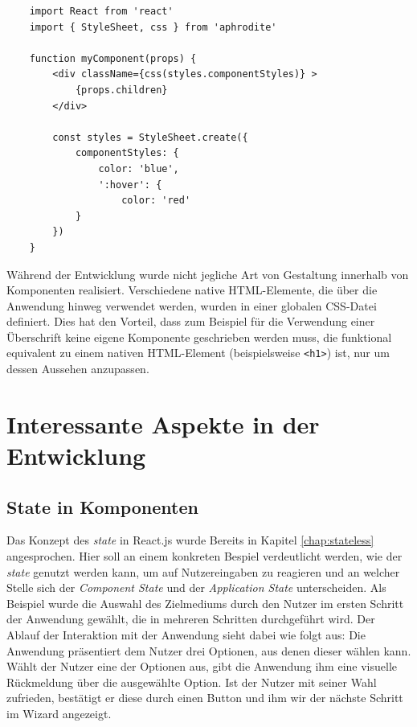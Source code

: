 
\begin{lstlisting}
	import React from 'react'
	import { StyleSheet, css } from 'aphrodite'

	function myComponent(props) {
		<div className={css(styles.componentStyles)} >
			{props.children}
		</div>

		const styles = StyleSheet.create({
			componentStyles: {
				color: 'blue',
				':hover': {
					color: 'red'
			}
		})
	}
\end{lstlisting}

Während der Entwicklung wurde nicht jegliche Art von Gestaltung innerhalb von Komponenten realisiert. Verschiedene native HTML-Elemente, die über die Anwendung hinweg verwendet werden, wurden in einer globalen CSS-Datei definiert. Dies hat den Vorteil, dass zum Beispiel für die Verwendung einer Überschrift keine eigene Komponente geschrieben werden muss, die funktional equivalent zu einem nativen HTML-Element (beispielsweise \verb|<h1>|) ist, nur um dessen Aussehen anzupassen.

\section{Interessante Aspekte in der Entwicklung}

\subsection{State in Komponenten}
\label{chap:state_component}
Das Konzept des \textit{state} in React.js wurde Bereits in Kapitel \ref{chap:stateless} angesprochen. Hier soll an einem konkreten Bespiel verdeutlicht werden, wie der \textit{state} genutzt werden kann, um auf Nutzereingaben zu reagieren und an welcher Stelle sich der \textit{Component State} und der \textit{Application State} unterscheiden.
Als Beispiel wurde die Auswahl des Zielmediums durch den Nutzer im ersten Schritt der Anwendung gewählt, die in mehreren Schritten durchgeführt wird.
Der Ablauf der Interaktion mit der Anwendung sieht dabei wie folgt aus:
Die Anwendung präsentiert dem Nutzer drei Optionen, aus denen dieser wählen kann. Wählt der Nutzer eine der Optionen aus, gibt die Anwendung ihm eine visuelle Rückmeldung über die ausgewählte Option. Ist der Nutzer mit seiner Wahl zufrieden, bestätigt er diese durch einen Button und  ihm wir der nächste Schritt im Wizard angezeigt.

